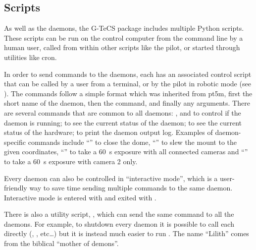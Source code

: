 \subsection{Scripts}
\label{sec:scripts}
\begin{colsection}

As well as the daemons, the G-TeCS package includes multiple Python scripts. These scripts can be run on the control computer from the command line by a human user, called from within other scripts like the pilot, or started through utilities like cron.

In order to send commands to the daemons, each has an associated control script that can be called by a user from a terminal, or by the pilot in robotic mode (see ). The commands follow a simple format which was inherited from pt5m, first the short name of the daemon, then the command, and finally any arguments. There are several commands that are common to all daemons: ,  and  to control if the daemon is running;  to see the current status of the daemon;  to see the current status of the hardware;  to print the daemon output log. Examples of daemon-specific commands include ``'' to close the dome, ``'' to slew the mount to the given coordinates, ``'' to take a \SI{60}{\second} exposure with all connected cameras and ``'' to take a \SI{60}{\second} exposure with camera 2 only.

Every daemon can also be controlled in ``interactive mode'', which is a user-friendly way to save time sending multiple commands to the same daemon. Interactive mode is entered with  and exited with .

There is also a utility script, , which can send the same command to all the daemons. For example, to shutdown every daemon it is possible to call each directly (, ,  etc\ldots) but it is instead much easier to run . The name ``Lilith'' comes from the biblical ``mother of demons''.


\end{colsection}
